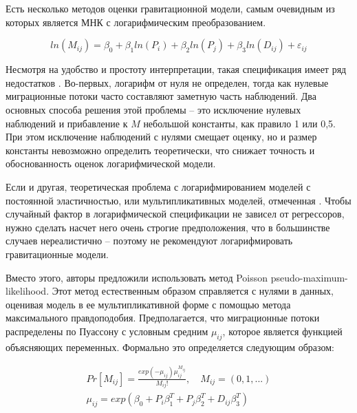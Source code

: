 \documentclass[a4paper,12pt]{article}
\begin{document}

Есть несколько методов оценки гравитационной модели, самым очевидным из которых является МНК с логарифмическим преобразованием.

\begin{equation}\label{eq:log}
	ln(M_{ij}) = \beta_0 + {\beta_1}ln(P_{i}) + {\beta_2}ln(P_{j}) + {\beta_3}ln(D_{ij}) + \varepsilon_{ij}
\end{equation}

Несмотря на удобство и простоту интерпретации, такая спецификация имеет ряд недостатков \citep{silva_log_2006}. Во-первых, логарифм от нуля не определен, тогда как нулевые миграционные потоки часто составляют заметную часть наблюдений. Два основных способа решения этой проблемы – это исключение нулевых наблюдений и прибавление к $M$ небольшой константы, как правило 1 или 0,5. При этом исключение наблюдений с нулями смещает оценку, но и размер константы невозможно определить теоретически, что снижает точность и обоснованность оценок логарифмической модели. 

Если и другая, теоретическая проблема с логарифмированием моделей с постоянной эластичностью, или мультипликативных моделей, отмеченная \citeauthor{silva_log_2006}. Чтобы случайный фактор в логарифмической спецификации не зависел от регрессоров, нужно сделать насчет него очень строгие предположения, что в большинстве случаев нереалистично -- поэтому \citeauthor{silva_log_2006} не рекомендуют логарифмировать гравитационные модели. 

Вместо этого, авторы предложили использовать метод Poisson pseudo-maximum-likelihood. Этот метод естественным образом справляется с нулями в данных, оценивая модель в ее мультипликативной форме с помощью метода максимального правдоподобия. Предполагается, что миграционные потоки распределены по Пуассону с условным средним $\mu_{ij}$, которое является функцией объясняющих переменных. Формально это определяется следующим образом:

\begin{gather*}\label{eq:poisson0}
	Pr[M_{ij}] = \frac{exp(-\mu_{ij})\mu^{M_{ij}}_{ij}}{M_{ij}!},\quad M_{ij} = (0, 1, ...) \\
	\mu_{ij} = exp(\beta_0 + P_i \beta_1^T + P_{j} \beta_2^T + D_{ij} \beta_3^T)
\end{gather*}
\end{document}
